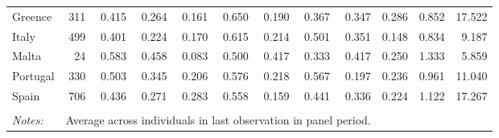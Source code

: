 \begin{tabular}{lrrrrrrrrrrr}
  \hspace{10mm} Greence &  311 & 0.415 & 0.264 & 0.161 & 0.650 & 0.190 & 0.367 & 0.347 & 0.286 & 0.852 & 17.522 \\ 
  \hspace{10mm} Italy &  499 & 0.401 & 0.224 & 0.170 & 0.615 & 0.214 & 0.501 & 0.351 & 0.148 & 0.834 & 9.187 \\ 
  \hspace{10mm} Malta &   24 & 0.583 & 0.458 & 0.083 & 0.500 & 0.417 & 0.333 & 0.417 & 0.250 & 1.333 & 5.859 \\ 
  \hspace{10mm} Portugal &  330 & 0.503 & 0.345 & 0.206 & 0.576 & 0.218 & 0.567 & 0.197 & 0.236 & 0.961 & 11.040 \\ 
  \hspace{10mm} Spain &  706 & 0.436 & 0.271 & 0.283 & 0.558 & 0.159 & 0.441 & 0.336 & 0.224 & 1.122 & 17.267 \\ 
   \hline\hline \\[-1.8ex] 
 \emph{Notes:} &\multicolumn{8}{l}{Average across individuals in last observation in panel period.}\\ 
\end{tabular}
